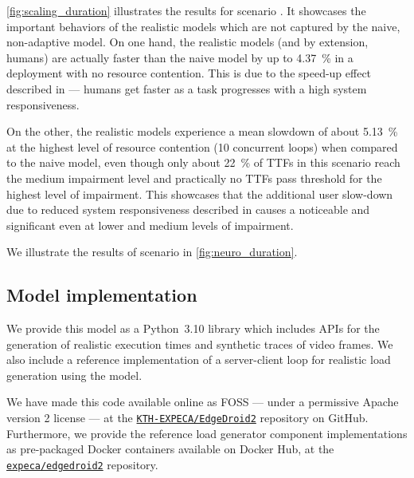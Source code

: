 \cref{fig:scaling_duration} illustrates the results for scenario . 
It showcases the important behaviors of the realistic models which are not captured by the naive, non-adaptive model.
On one hand, the realistic models (and by extension, humans) are actually faster than the naive model by up to \SI{4.37}{\percent} in a deployment with no resource contention.
This is due to the speed-up effect described in \textcite{olguinmunoz:impact2021} --- humans get faster as a task progresses with a high system responsiveness.

On the other, the realistic models experience a mean slowdown of about \SI{5.13}{\percent} at the highest level of resource contention (\num{10} concurrent loops) when compared to the naive model, even though only about \SI{22}{\percent} of \acp{TTF} in this scenario reach the medium impairment level and practically no \acp{TTF} pass threshold for the highest level of impairment.
This showcases that the additional user slow-down due to reduced system responsiveness described in \textcite{olguinmunoz:impact2021} causes a noticeable and significant  even at lower and medium levels of impairment.

\medskip

We illustrate the results of scenario  in \cref{fig:neuro_duration}.

\subsection{Model implementation}\label{ssec:model:impl}

We provide this model as a Python~\num{3.10} library which includes \acp{API} for the generation of realistic execution times and synthetic traces of video frames.
We also include a reference implementation of a server-client loop for realistic load generation using the model.

We have made this code available online as \ac{FOSS} --- under a permissive Apache version 2 license --- at the \href{https://github.com/KTH-EXPECA/EdgeDroid2}{\texttt{KTH-EXPECA/EdgeDroid2}} repository on GitHub.
Furthermore, we provide the reference load generator component implementations as pre-packaged Docker containers available on Docker Hub, at the \href{https://hub.docker.com/r/expeca/edgedroid2}{\texttt{expeca/edgedroid2}} repository.


